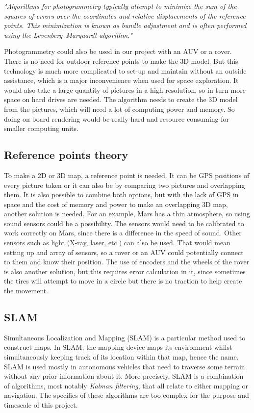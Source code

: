 \textit{"Algorithms for photogrammetry typically attempt to minimize the sum of the squares of errors over the coordinates and relative displacements of the reference points. This minimization is known as bundle adjustment and is often performed using the Levenberg–Marquardt algorithm."\cite{Photogrammetry}}

Photogrammetry could also be used in our project with an AUV or a rover. There is no need for outdoor reference points to make the 3D model. But this technology is much more complicated to set-up and maintain without an outside assistance, which is a major inconvenience when used for space exploration. It would also take a large quantity of pictures in a high resolution, so in turn more space on hard drives are needed. The algorithm needs to create the 3D model from the pictures, which will need a lot of computing power and memory. So doing on board rendering would be really hard and resource consuming for smaller computing units.\cite{photo}

\subsection{Reference points theory}

To make a 2D or 3D map, a reference point is needed. It can be GPS positions of every picture taken or it can also be by comparing two pictures and overlapping them. It is also possible to combine both options, but with the lack of GPS in space and the cost of memory and power to make an overlapping 3D map, another solution is needed. For an example, Mars has a thin atmosphere, so using sound sensors could be a possibility. The sensors would need to be calibrated to work correctly on Mars, since there is a difference in the speed of sound. Other sensors such as light (X-ray, laser, etc.) can also be used. That would mean setting up and array of sensors, so a rover or an AUV could potentially connect to them and know their position. The use of encoders and the wheels of the rover is also another solution, but this requires error calculation in it, since sometimes the tires will attempt to move in a circle but there is no traction to help create the movement\cite{reference}.

\subsection{SLAM}

Simultaneous Localization and Mapping (SLAM) is a particular method used to construct maps. In SLAM, the mapping device maps its environment whilst simultaneously keeping track of its location within that map, hence the name. SLAM is used mostly in autonomous vehicles that need to traverse some terrain without any prior information about it. More precisely, SLAM is a combination of algorithms, most notably \textit{Kalman filtering}, that all relate to either mapping or navigation. The specifics of these algorithms are too complex for the purpose and timescale of this project.

